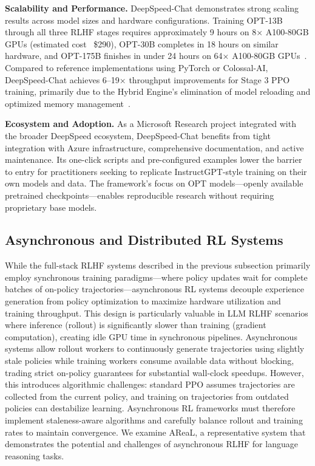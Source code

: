 \documentclass[conference]{IEEEtran}
\begin{document}
\textbf{Scalability and Performance.} DeepSpeed-Chat demonstrates strong scaling results across model sizes and hardware configurations. Training OPT-13B through all three RLHF stages requires approximately 9 hours on 8× A100-80GB GPUs (estimated cost ~\$290), OPT-30B completes in 18 hours on similar hardware, and OPT-175B finishes in under 24 hours on 64× A100-80GB GPUs~\cite{deepspeed-chat-paper}. Compared to reference implementations using PyTorch or Colossal-AI, DeepSpeed-Chat achieves 6–19× throughput improvements for Stage 3 PPO training, primarily due to the Hybrid Engine's elimination of model reloading and optimized memory management~\cite{deepspeed-chat-paper}.

\textbf{Ecosystem and Adoption.} As a Microsoft Research project integrated with the broader DeepSpeed ecosystem, DeepSpeed-Chat benefits from tight integration with Azure infrastructure, comprehensive documentation, and active maintenance. Its one-click scripts and pre-configured examples lower the barrier to entry for practitioners seeking to replicate InstructGPT-style training on their own models and data. The framework's focus on OPT models—openly available pretrained checkpoints—enables reproducible research without requiring proprietary base models.


\subsection{Asynchronous and Distributed RL Systems}

While the full-stack RLHF systems described in the previous subsection primarily employ synchronous training paradigms—where policy updates wait for complete batches of on-policy trajectories—asynchronous RL systems decouple experience generation from policy optimization to maximize hardware utilization and training throughput. This design is particularly valuable in LLM RLHF scenarios where inference (rollout) is significantly slower than training (gradient computation), creating idle GPU time in synchronous pipelines. Asynchronous systems allow rollout workers to continuously generate trajectories using slightly stale policies while training workers consume available data without blocking, trading strict on-policy guarantees for substantial wall-clock speedups. However, this introduces algorithmic challenges: standard PPO assumes trajectories are collected from the current policy, and training on trajectories from outdated policies can destabilize learning. Asynchronous RL frameworks must therefore implement staleness-aware algorithms and carefully balance rollout and training rates to maintain convergence. We examine AReaL, a representative system that demonstrates the potential and challenges of asynchronous RLHF for language reasoning tasks.
\end{document}
